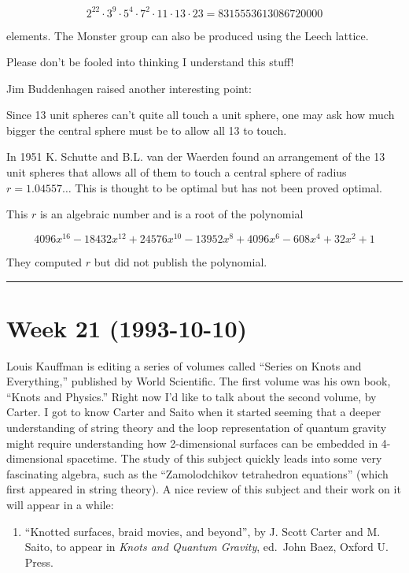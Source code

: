 \documentclass{article}
\def\tightlist{}
\begin{document}
\[2^{22}\cdot 3^9\cdot 5^4\cdot 7^2\cdot 11\cdot 13\cdot 23 = 8315553613086720000\]

elements. The Monster group can also be produced using the Leech
lattice.

Please don't be fooled into thinking I understand this stuff!

Jim Buddenhagen raised another interesting point:

Since 13 unit spheres can't quite all touch a unit sphere, one may ask
how much bigger the central sphere must be to allow all 13 to touch.

In 1951 K. Schutte and B.L. van der Waerden found an arrangement of the
13 unit spheres that allows all of them to touch a central sphere of
radius \(r=1.04557\ldots\) This is thought to be optimal but has not
been proved optimal.

This \(r\) is an algebraic number and is a root of the polynomial

\[4096 x^{16} - 18432 x^{12} + 24576 x^{10} - 13952 x^8 + 4096 x^6 - 608x^4 + 32 x^2 + 1\]

They computed \(r\) but did not publish the polynomial.

\begin{center}\rule{0.5\linewidth}{0.5pt}\end{center}
\hypertarget{week-21-1993-10-10}{%
\section{Week 21 (1993-10-10)}\label{week-21-1993-10-10}}

Louis Kauffman is editing a series of volumes called ``Series on Knots
and Everything,'' published by World Scientific. The first volume was
his own book, ``Knots and Physics.'' Right now I'd like to talk about
the second volume, by Carter. I got to know Carter and Saito when it
started seeming that a deeper understanding of string theory and the
loop representation of quantum gravity might require understanding how
2-dimensional surfaces can be embedded in 4-dimensional spacetime. The
study of this subject quickly leads into some very fascinating algebra,
such as the ``Zamolodchikov tetrahedron equations'' (which first
appeared in string theory). A nice review of this subject and their work
on it will appear in a while:

\begin{enumerate}
\def\labelenumi{\arabic{enumi})}
\tightlist
\item
  ``Knotted surfaces, braid movies, and beyond'', by J. Scott Carter and
  M. Saito, to appear in \emph{Knots and Quantum Gravity}, ed.~John
  Baez, Oxford U. Press.
\end{enumerate}
\end{document}
